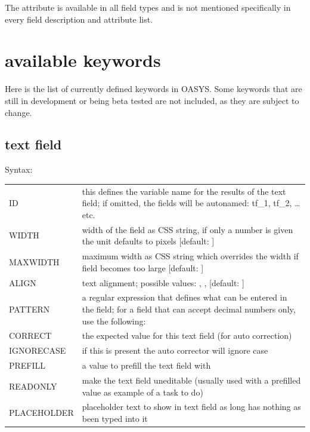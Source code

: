 \documentclass[12pt]{article} %
\newenvironment{keyword}{\leavevmode\color{magenta}}{}
\newenvironment{properties}
	{
    	\footnotesize\renewcommand{\arraystretch}{1.30}
  		\renewcommand{\tabcolsep}{0pt}
   		\begin{longtable}{>{\begin{keyword}}p{3.1cm}<{\end{keyword}}p{13.9cm}}
    	\hline
	}
	{
		\hline\end{longtable}\vspace{5mm}
	}
\begin{document}
The  attribute is available in all field types and is not mentioned specifically in every field description and attribute list.

\newpage

\section{available keywords}\label{sec:available-keywords}

Here is the list of currently defined keywords in OASYS. Some keywords that are still in development or being beta tested are not included, as they are subject to change.

\subsection{text field}\label{subsec:text-field}

Syntax:\hspace{0.5cm}\kw{[@TF ... @]}

\begin{properties}
ID & this defines the variable name for the results of the text field;
if omitted, the fields will be autonamed: tf\_1, tf\_2, \ldots etc.\\
WIDTH & width of the field as CSS string, if only a number is given the unit defaults to pixels [default: \kw{200}]\\
MAXWIDTH & maximum width as CSS string which overrides the width if field becomes too large [default: \kw{calc(100\% - 25px)}]\\
ALIGN & text alignment;
possible values: \kw{left}, \kw{center}, \kw{right} [default: \kw{left}]\\
PATTERN & a regular expression that defines what can be entered in the field;
for a field that can accept decimal numbers only, use the following: \newline \kw{PATTERN="\string^\string\-?(\string\d*[.,])?\string\d*\$"} \\
CORRECT & the expected value for this text field (for auto correction) \\
IGNORECASE & if this is present the auto corrector will ignore case \\
PREFILL & a value to prefill the text field with \\
READONLY & make the text field uneditable (usually used with a prefilled value as example of a task to do) \\
PLACEHOLDER & placeholder text to show in text field as long has nothing as been typed into it \\
\end{properties}
\vspace{0.1cm}
\end{document}
